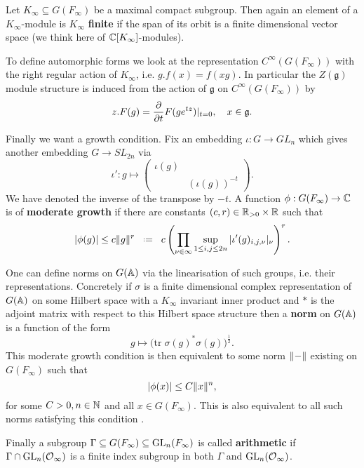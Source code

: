	Let \(K_\infty\subseteq  G(F_\infty)\) be a maximal compact subgroup. Then again an element of a \(K_\infty\)-module is \(K_\infty\) \textbf{finite} if the span of its orbit is a finite dimensional vector space (we think here of \(\C[K_\infty]\)-modules).

	To define automorphic forms we look at the representation \(C^\infty(G(F_\infty))\) with the right regular action of \(K_\infty\), i.e. \(g.f(x) = f(xg)\).  In particular the \(Z(\mathfrak{g})\) module structure is induced from the action of \(\mathfrak{g}\) on \(C^\infty(G(F_\infty))\) by \label{lie_algebra_action}
	\[z.F(g) = \frac{\partial }{\partial t}F(ge^{tz})|_{t=0}, \quad x\in \mathfrak{g}.\] 
	
	Finally we want a growth condition. Fix an embedding \(\iota : G\to GL_n\) which gives another embedding \(G\to SL_{2n}\) via
	\[\iota': g\mapsto \begin{pmatrix}
		\iota (g) & \\
		& (\iota (g))^{-t}
	\end{pmatrix}.\]
	We have denoted the inverse of the transpose by \(-t\). A function \(\phi : G(F_\infty) \to \C \) is of \textbf{moderate growth} if there are constants \((c,r)\in \R_{>0}\times \R\) such that 
	\[|\phi(g)| \leq c\norm{g}^r \defeq c \left(\prod_{\nu\in\infty} \sup_{1\leq i, j\leq 2n} |\iota' (g)_{i,j, \nu}|_\nu\right)^r.\]

	\begin{remark}
		One can define norms on \(G(\A)\) via the linearisation of such groups, i.e. their representations. Concretely if \(\sigma\) is a finite dimensional complex representation of \(G(\A)\) on some Hilbert space with a \(K_\infty\) invariant inner product and \(\ast\) is the adjoint matrix with respect to this Hilbert space structure then a \textbf{norm} on \(G(\A)\) is a function of the form
		\[g\mapsto \big(\mathrm{tr }\; \sigma(g)^*\sigma(g)\big)^{\frac{1}{2}}.\]
		This moderate growth condition is then equivalent to some norm \(\lVert  -  \rVert\) existing on \(G(F_\infty)\) such that 
		\[|\phi(x)| \leq C\norm{x}^n,\]
		for some \(C>0, n\in \N\) and all \(x\in G(F_\infty)\). This is also equivalent to all such norms satisfying this condition \cite[1.2]{borelAutomorphicFormsRepresentations1979}.
	\end{remark}
	
	Finally a subgroup \(\Gamma \subseteq G(F_\infty)\subseteq \operatorname{GL}_n(F_\infty)\) is called \textbf{arithmetic} if \(\Gamma \cap \GL_n(\Struc_\infty)\) is a finite index subgroup in both \(\Gamma\) and \(\GL_n(\Struc_\infty)\).

